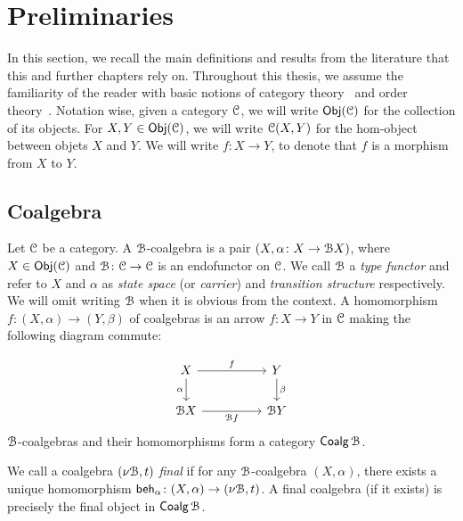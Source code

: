\section{Preliminaries}\label{c2:sec:preliminaries}
In this section, we recall the main definitions and results from the literature that this and further chapters rely on. Throughout this thesis, we assume the familiarity of the reader with basic notions of category theory~\cite{Abramsky:2010:Introduction} and order theory~\cite{Davey:2002:Introduction}. Notation wise, given a category $\mathcal{C}$, we will write $\mathsf{Obj}(\mathcal{C})$ for the collection of its objects. For $X,Y \in \mathsf{Obj}(\mathcal{C})$, we will write $\mathcal{C}(X,Y)$ for the hom-object between objets $X$ and $Y$. We will write $f \colon X \to Y$, to denote that $f$ is a morphism from $X$ to $Y$.
\subsection{Coalgebra}\label{c2:subsec:coalgebra}

Let $\mathcal{C}$ be a category.  A $\mathcal{B}$-coalgebra is a pair $(X, \alpha \colon X \to \mathcal{B} X)$, where $X \in \mathsf{Obj}(\mathcal{C})$ and $\mathcal{B} \colon \mathcal{C} \to \mathcal{C}$ is an endofunctor on $\mathcal{C}$. We call $\mathcal{B}$ a \emph{type functor} and refer to $X$ and $\alpha$ as \emph{state space} (or \emph{carrier}) and \emph{transition structure} respectively. We will omit writing $\mathcal{B}$ when it is obvious from the context. A homomorphism $f \colon (X, \alpha) \to (Y, \beta)$ of coalgebras is an arrow $f \colon X \to Y$ in $\mathcal{C}$ making the following diagram commute:

\[\begin{tikzcd}
	X && Y \\
	{\funB X} && {\funB Y}
	\arrow["f", from=1-1, to=1-3]
	\arrow["\alpha"', from=1-1, to=2-1]
	\arrow["\beta", from=1-3, to=2-3]
	\arrow["{\funB f}"', from=2-1, to=2-3]
\end{tikzcd}\]
$\mathcal{B}$-coalgebras and their homomorphisms form a category $\mathop{\mathsf{Coalg}}{\mathcal{B}}$. 

\begin{definition}\label{c2:def:final_coalgebra}
We call a coalgebra $(\nu \mathcal{B}, t)$ \emph{final} if for any $\mathcal{B}$-coalgebra $(X, \alpha)$, there exists a unique homomorphism $\mathsf{beh}_{\alpha} \colon (X, \alpha) \to (\nu \mathcal{B}, t)$. A final coalgebra (if it exists) is precisely the final object in $\mathop{\mathsf{Coalg}}{\mathcal{B}}$.	
\end{definition}

